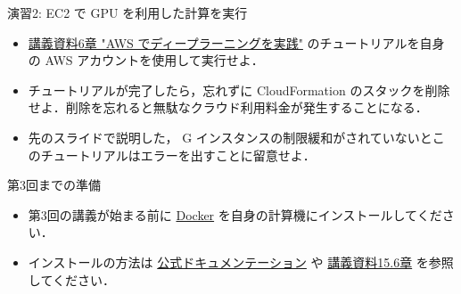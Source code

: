 \documentclass[unicode,11pt]{beamer}
\begin{document}
\begin{frame}{演習2: EC2 で GPU を利用した計算を実行}

\begin{itemize}
    \item \href{https://tomomano.github.io/learn-aws-by-coding/#sec_jupyter_and_deep_learning}{講義資料6章 "AWS でディープラーニングを実践"} のチュートリアルを自身の AWS アカウントを使用して実行せよ．
    \item チュートリアルが完了したら，忘れずに CloudFormation のスタックを削除せよ．削除を忘れると無駄なクラウド利用料金が発生することになる．
    \item 先のスライドで説明した， G インスタンスの制限緩和がされていないとこのチュートリアルはエラーを出すことに留意せよ．
\end{itemize}

\end{frame}

\begin{frame}{第3回までの準備}

\begin{itemize}
    \item 第3回の講義が始まる前に
    \href{https://www.docker.com/}{Docker}
    を自身の計算機にインストールしてください．
    \item インストールの方法は
    \href{https://docs.docker.com/engine/install/}{公式ドキュメンテーション}
    や
    \href{https://tomomano.github.io/learn-aws-by-coding/#sec:install_docker}{講義資料15.6章}
    を参照してください．
\end{itemize}
    
\end{frame}
\end{document}
